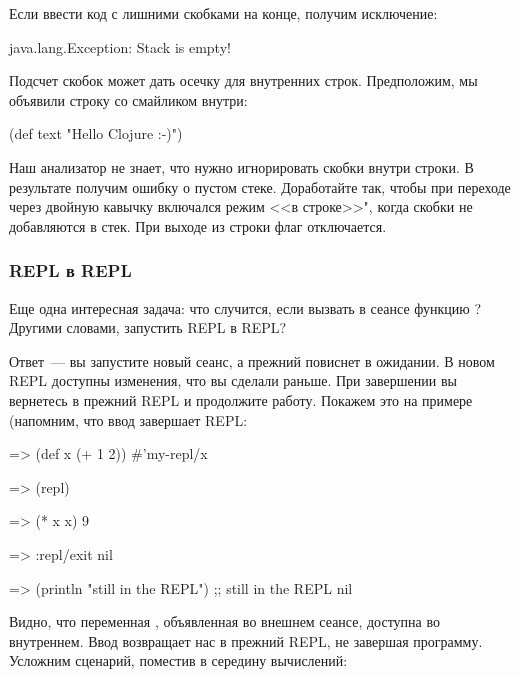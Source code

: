 Если ввести код с лишними скобками на конце, получим исключение:

\begin{english}
  \begin{text}
java.lang.Exception: Stack is empty!
  \end{text}
\end{english}

Подсчет скобок может дать осечку для внутренних строк. Предположим, мы объявили строку со смайликом внутри:

\begin{english}
  \begin{clojure}
(def text "Hello Clojure :-)")
  \end{clojure}
\end{english}

Наш анализатор не знает, что нужно игнорировать скобки внутри строки. В результате получим ошибку о пустом стеке. Доработайте  так, чтобы при переходе через двойную кавычку включался режим <<в строке>>", когда скобки не добавляются в стек. При выходе из строки флаг отключается.

\subsubsection{REPL в REPL}

Еще одна интересная задача: что случится, если вызвать в сеансе функцию ? Другими словами, запустить REPL в REPL?

Ответ~--- вы запустите новый сеанс, а прежний повиснет в ожидании. В новом REPL доступны изменения, что вы сделали раньше. При завершении вы вернетесь в прежний REPL и продолжите работу. Покажем это на примере (напомним, что ввод  завершает REPL:

\begin{english}
  \begin{clojure}
=> (def x (+ 1 2))
#'my-repl/x

=> (repl)

=> (* x x)
9

=> :repl/exit
nil

=> (println "still in the REPL")
;; still in the REPL
nil
  \end{clojure}
\end{english}

Видно, что переменная , объявленная во внешнем сеансе, доступна во внутреннем. Ввод  возвращает нас в прежний REPL, не завершая программу. Усложним сценарий, поместив  в середину вычислений:

